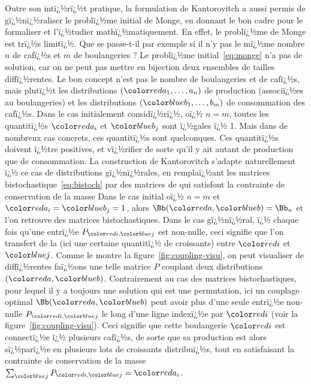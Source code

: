 Outre son intï¿½rï¿½t pratique, la formulation de Kantorovitch a aussi permis de gï¿½nï¿½raliser le problï¿½me initial de Monge, en donnant le bon cadre pour le formaliser et l'ï¿½tudier mathï¿½matiquement. En effet, le problï¿½me de Monge est trï¿½s limitï¿½. Que se passe-t-il par exemple si il n'y pas le mï¿½me nombre $n$ de cafï¿½s et $m$ de boulangeries ? Le problï¿½me initial~\eqref{eq:monge} n'a pas de solution, car on ne peut pas mettre en bijection deux ensembles de tailles diffï¿½rentes. Le bon concept n'est pas le nombre de boulangeries et de cafï¿½s, mais plutï¿½t les distributions $(\Red{a_1,\ldots,a_n})$ de production (associï¿½es au boulangeries) et les distributions $(\Blu{b_1,\ldots,b_m})$ de consommation des cafï¿½s.  Dans le cas initialement considï¿½rï¿½, oï¿½ $n=m$, toutes les quantitï¿½s $\Red{a_i}$ et $\Blu{b_j}$ sont ï¿½gales ï¿½ 1. Mais dans de nombreux cas concrets, ces quantitï¿½s sont quelconques. Ces quantitï¿½s doivent ï¿½tre positives, et vï¿½rifier 
de sorte qu'il y ait autant de production que de consommation. La construction de Kantorovitch s'adapte naturellement ï¿½ ce cas de distributions gï¿½nï¿½rales, en remplaï¿½ant les matrices bistochastique~\eqref{eq:bistoch} par des matrices de  qui satisfont la contrainte de conservation de la masse 
Dans le cas initial oï¿½ $n=m$ et $\Red{a_i}=\Blu{b_j}=1$, alors $\Bb(\aC,\bC) = \Bb_n$ et l'on retrouve des matrices bistochastiques. Dans le cas gï¿½nï¿½ral, ï¿½ chaque fois qu'une entrï¿½e $P_{\iC,\jC}$ est non-nulle, ceci signifie que l'on transfert de la  (ici une certaine quantitï¿½ de croissants) entre $\iC$ et $\jC$. Comme le montre la figure~\ref{fig:coupling-visu}, on peut visualiser de diffï¿½rentes faï¿½ons une telle matrice $P$ couplant deux distributions $(\aC,\bC)$.
%
Contrairement au cas des matrices bistochastiques, pour lequel il y a toujours une solution qui est une permutation, ici un couplage optimal $\Bb(\aC,\bC)$ peut avoir plus d'une seule entrï¿½e non-nulle $P_{\iC,\jC}$ le long d'une ligne indexï¿½e par $\iC$ (voir la figure~\ref{fig:coupling-visu}). Ceci signifie que cette boulangerie $\iC$ est connectï¿½e ï¿½ plusieurs cafï¿½s, de sorte que sa production est alors sï¿½parï¿½e en plusieurs lots de croissants distribuï¿½s, tout en satisfaisant la contrainte de conservation de la masse $\sum_{\jC} P_{\iC,\jC}=\Red{a_i}$.

